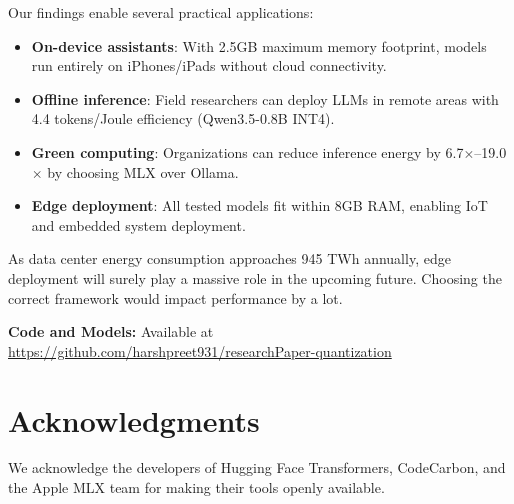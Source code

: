 \documentclass[conference]{IEEEtran}
\begin{document}
Our findings enable several practical applications:
\begin{itemize}[leftmargin=*,nosep]
    \item \textbf{On-device assistants}: With 2.5GB maximum memory footprint, models run entirely on iPhones/iPads without cloud connectivity.
    \item \textbf{Offline inference}: Field researchers can deploy LLMs in remote areas with 4.4 tokens/Joule efficiency (Qwen3.5-0.8B INT4).
    \item \textbf{Green computing}: Organizations can reduce inference energy by 6.7$\times$--19.0$\times$ by choosing MLX over Ollama.
    \item \textbf{Edge deployment}: All tested models fit within 8GB RAM, enabling IoT and embedded system deployment.
\end{itemize}

As data center energy consumption approaches 945 TWh annually, edge deployment will surely play a massive role in the upcoming future. Choosing the correct framework would impact performance by a lot.

\begin{sloppypar}
\noindent\textbf{Code and Models:} Available at \url{https://github.com/harshpreet931/researchPaper-quantization}
\end{sloppypar}

\section*{Acknowledgments}

We acknowledge the developers of Hugging Face Transformers, CodeCarbon, and the Apple MLX team for making their tools openly available.


\end{document}
